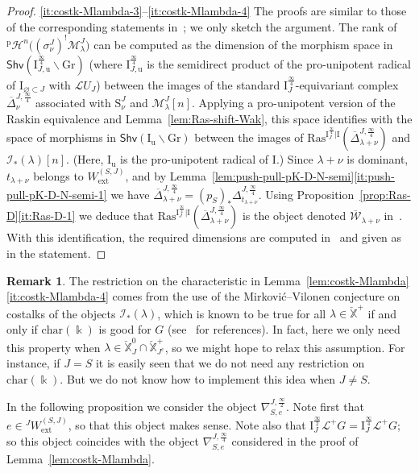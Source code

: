 \documentclass[11pt]{amsart}
\numberwithin{equation}{section}
\theoremstyle{plain}
\theoremstyle{definition}
\newtheorem{rmk}[thm]{Remark}
\newcommand{\sH}{{\mathcal H}}
\newcommand{\I}{{\mathrm I}}
\newcommand{\sI}{{\mathcal I}}
\renewcommand{\k}{\Bbbk}
\newcommand{\sL}{{\mathcal L}}
\newcommand{\sM}{{\mathcal M}}
\newcommand{\sW}{{\mathcal W}}
\newcommand{\X}{{\mathbb X}}
\newcommand{\Xd}{\check{\X}}
\newcommand{\semi}{{{\frac{\infty}{2}}}}
\newcommand{\quar}{{{\frac{\infty}{4}}}}
\newcommand{\ex}{\mathrm{ext}}
\newcommand{\Shv}{\mathsf{Shv}}
\newcommand{\Ras}{\mathrm{Ras}}
\newcommand{\Gr}{\mathrm{Gr}}
\newcommand{\Iu}{\mathrm{I}_{\mathrm{u}}}
\newcommand{\comp}{\mathrm{c}}
\begin{document}
\begin{proof}
\eqref{it:costk-Mlambda-3}--\eqref{it:costk-Mlambda-4}
The proofs are similar to those of the corresponding statements in~\cite[Lemma 6.18]{adr}; we only sketch the argument. The rank of ${}^{\mathrm{p}}\sH^n \big( (\sigma^J_\nu)^!\sM^J_\lambda \big)$ can be computed as the dimension of the morphism space in $\Shv(\I_{J,\mathrm{u}}^\quar \backslash \Gr)$ (where $\I_{J,\mathrm{u}}^\quar$ is the semidirect product of the pro-unipotent radical of $\I_{\varnothing \subset J}$ with $\sL U_J$) between the images of the standard $\I_J^\quar$-equivariant complex $\overline{\Delta}^{J,\quar}_{\nu}$ associated with $\mathrm{S}^J_\nu$ and $\sM^J_\lambda[n]$. Applying a pro-unipotent version of the Raskin equivalence and Lemma~\ref{lem:Ras-shift-Wak}, this space identifies with the space of morphisms in $\Shv(\Iu \backslash \Gr)$ between the images of $\Ras^{\I^\quar_J | \I}(\overline{\Delta}^{J,\quar}_{\lambda+\nu})$ and $\sI_*(\lambda)[n]$. (Here, $\Iu$ is the pro-unipotent radical of $\I$.) Since $\lambda+\nu$ is dominant, $t_{\lambda+\nu}$ belongs to $W_\ex^{(S,J)}$, and by Lemma~\ref{lem:push-pull-pK-D-N-semi}\eqref{it:push-pull-pK-D-N-semi-1} we have $\overline{\Delta}^{J,\quar}_{\lambda+\nu}=(p_S)_* \Delta^{J,\quar}_{t_{\lambda+\nu}}$. Using Proposition~\ref{prop:Ras-D}\eqref{it:Ras-D-1} we deduce that $\Ras^{\I^\quar_J | \I}(\overline{\Delta}^{J,\quar}_{\lambda+\nu})$ is the object denoted $\overline{\sW}_{\lambda+\nu}$ in~\cite{adr}. With this identification, the required dimensions are computed in~\cite{adr} and given as in the statement.
\end{proof}

\begin{rmk}
The restriction on the characteristic in Lemma~\ref{lem:costk-Mlambda}\eqref{it:costk-Mlambda-4} comes from the use of the Mirkovi{\'c}--Vilonen conjecture on costalks of the objects $\sI_*(\lambda)$, which is known to be true for all $\lambda \in \Xd^+$ if and only if $\mathrm{char}(\k)$ is good for $G$ (see~\cite[Proof of Lemma~6.18]{adr} for references). In fact, here we only need this property when $\lambda \in \Xd^0_J \cap \Xd_{J^\comp}^+$, so we might hope to relax this assumption. For instance, if $J=S$ it is easily seen that we do not need any restriction on $\mathrm{char}(\k)$. But we do not know how to implement this idea when $J \neq S$.
\end{rmk}

In the following proposition we consider the object $\nabla^{J,\semi}_{S,e}$. Note first that $e \in {}^J W_\ex^{(S,J)}$, so that this object makes sense. Note also that $\I_J^\semi \sL^+G = \I_J^\quar \sL^+ G$; so this object coincides with the object $\nabla^{J,\quar}_{S,e}$ considered in the proof of Lemma~\ref{lem:costk-Mlambda}.
\end{document}
